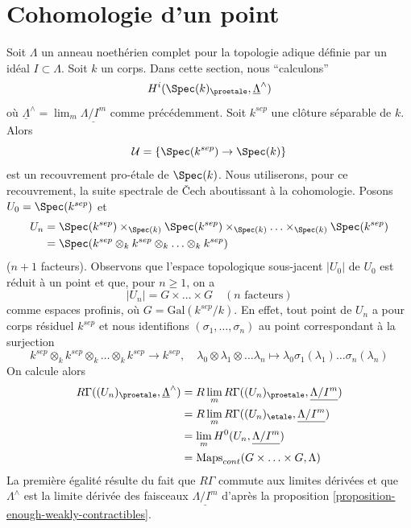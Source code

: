\section{Cohomologie d'un point}
\label{section-cohomology-point}

\noindent
Soit $\Lambda$ un anneau noethérien complet pour la topologie adique définie par un idéal
$I \subset \Lambda$. Soit $k$ un corps. Dans cette section, nous ``calculons''
$$
H^i(\Spec(k)_\proetale, \underline{\Lambda}^\wedge)
$$
où $\underline{\Lambda}^\wedge = \lim_m \underline{\Lambda/I^m}$ comme précédemment.
Soit $k^{sep}$ une clôture séparable de $k$.
Alors
$$
\mathcal{U} = \{\Spec(k^{sep}) \to \Spec(k)\}
$$
est un recouvrement pro-\'etale de $\Spec(k)$. Nous utiliserons, pour ce recouvrement, la suite spectrale de {\v C}ech
aboutissant à la cohomologie.
Posons $U_0 = \Spec(k^{sep})$ et
\begin{align*}
U_n & =
\Spec(k^{sep}) \times_{\Spec(k)}
\Spec(k^{sep}) \times_{\Spec(k)} \ldots
\times_{\Spec(k)} \Spec(k^{sep}) \\
& =
\Spec(k^{sep} \otimes_k k^{sep} \otimes_k \ldots \otimes_k k^{sep})
\end{align*}
($n + 1$ facteurs). Observons que l'espace topologique sous-jacent
$|U_0|$ de $U_0$ est réduit à un point et que, pour $n \geq 1$, on a
$$
|U_n| = G \times \ldots \times G\quad (n\text{ facteurs})
$$
comme espaces profinis, où $G = \text{Gal}(k^{sep}/k)$. En effet, tout
point de $U_n$ a pour corps résiduel $k^{sep}$ et nous identifions
$(\sigma_1, \ldots, \sigma_n)$ au point correspondant à la
surjection
$$
k^{sep} \otimes_k k^{sep} \otimes_k \ldots \otimes_k k^{sep}
\longrightarrow k^{sep}, \quad
\lambda_0 \otimes \lambda_1 \otimes \ldots \lambda_n
\longmapsto \lambda_0 \sigma_1(\lambda_1) \ldots \sigma_n(\lambda_n)
$$
On calcule alors
\begin{align*}
R\Gamma((U_n)_\proetale, \underline{\Lambda}^\wedge)
& =
R\lim_m R\Gamma((U_n)_\proetale, \underline{\Lambda/I^m}) \\
& =
R\lim_m R\Gamma((U_n)_\etale, \underline{\Lambda/I^m}) \\
& =
\lim_m H^0(U_n, \underline{\Lambda/I^m}) \\
& = 
\text{Maps}_{cont}(G \times \ldots \times G, \Lambda)
\end{align*}
La première égalité résulte du fait que $R\Gamma$ commute aux limites dérivées
et que $\Lambda^\wedge$ est la limite dérivée des faisceaux
$\underline{\Lambda/I^m}$ d'après
la proposition \ref{proposition-enough-weakly-contractibles}.
